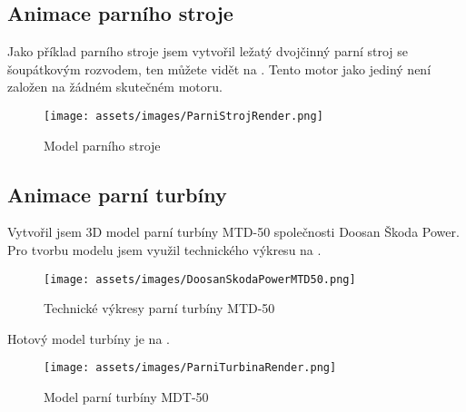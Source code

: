 \subsection{Animace parního stroje}
{Jako příklad parního stroje jsem vytvořil ležatý dvojčinný parní stroj se šoupátkovým rozvodem, ten můžete vidět na . Tento motor jako jediný není založen na žádném skutečném motoru.}
\begin{figure}[H]
    \centering
    \texttt{[image: assets/images/ParniStrojRender.png]}
    \caption{Model parního stroje \jaObr}
    \label{obr:ParniStrojRender}
\end{figure}
\newpage
\subsection{Animace parní turbíny}
{Vytvořil jsem 3D model parní turbíny MTD-50 společnosti Doosan Škoda Power. Pro tvorbu modelu jsem využil technického výkresu na .}
\begin{figure}[H]
    \centering
    \texttt{[image: assets/images/DoosanSkodaPowerMTD50.png]}
    \caption{Technické výkresy parní turbíny MTD-50 \cite{SP:ApplicationAspectsOfSteamTurbinesForCombinedHeatAndPowerGeneration}}
    \label{obr:DoosanSkodaPowerMTD50}
\end{figure}
{Hotový model turbíny je na .}
\begin{figure}[H]
    \centering
    \texttt{[image: assets/images/ParniTurbinaRender.png]}
    \caption{Model parní turbíny MDT-50 \jaObr}
    \label{obr:ParniTurbinaRender}
\end{figure}
\newpage
